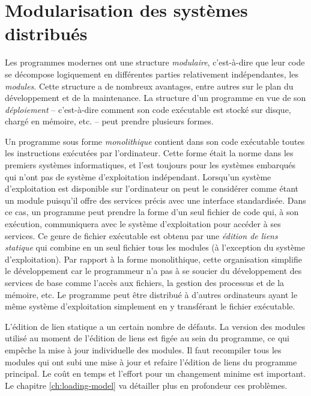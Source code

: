 
\chapter[]{Modularisation des systèmes distribués}%

Les programmes modernes ont une structure \textit{modulaire},
c'est-à-dire que leur code se décompose logiquement en différentes
parties relativement indépendantes, les \textit{modules}.  Cette
structure a de nombreux avantages, entre autres sur le plan du
développement et de la maintenance.  La structure d'un programme en
vue de son \textit{déploiement} -- c'est-à-dire comment son code
exécutable est stocké sur disque, chargé en mémoire, etc. -- peut prendre
plusieurs formes.

Un programme sous forme \textit{monolithique} contient dans son code exécutable
toutes les instructions exécutées par l'ordinateur.  Cette forme était la norme
dans les premiers systèmes informatiques, et l'est toujours pour les systèmes
embarqués qui n'ont pas de système d'exploitation indépendant.  Lorsqu'un
système d'exploitation est disponible sur l'ordinateur on peut le considérer
comme étant un module puisqu'il offre des services précis avec une interface
standardisée.  Dans ce cas, un programme peut prendre la forme d'un seul
fichier de code qui, à son exécution, communiquera avec le système
d'exploitation pour accéder à ses services.  Ce genre de fichier exécutable est
obtenu par une \textit{édition de liens statique} qui combine en un seul
fichier tous les modules (à l'exception du système d'exploitation).  Par
rapport à la forme monolithique, cette organisation simplifie le développement
car le programmeur n'a pas à se soucier du développement des services de base
comme l'accès aux fichiers, la gestion des processus et de la mémoire, etc.  Le
programme peut être distribué à d'autres ordinateurs ayant le même système
d'exploitation simplement en y transférant le fichier exécutable.

L'édition de lien statique a un certain nombre de défauts. La version des
modules utilisé au moment de l'édition de liens est figée au sein du
programme, ce qui empêche la mise à jour individuelle des modules. Il faut
recompiler tous les modules qui ont subi une mise à jour et refaire l'édition de liens du
programme principal. Le coût en temps et l'effort pour un changement minime
est important.  Le chapitre \ref{ch:loading-model} va détailler plus en profondeur
ces problèmes.

